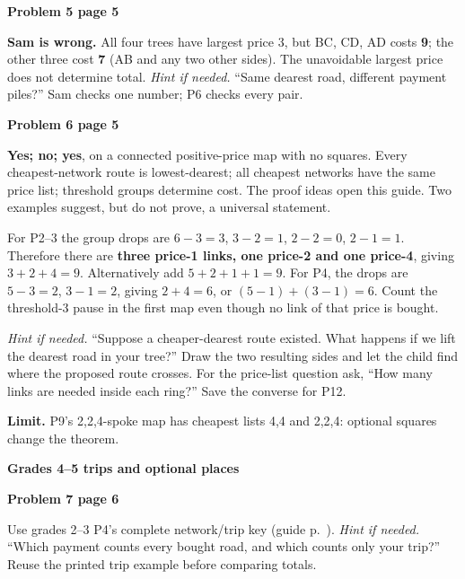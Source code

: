 \documentclass[11pt]{article}
\newcommand{\head}[1]{\par{\large\bfseries #1}\par\nobreak}
\newcommand{\sub}[1]{\par\textbf{#1}\par\nobreak}
\newcommand{\hint}[1]{\textit{Hint if needed.} #1}
\begin{document}
\sub{Problem 5 page 5}
\textbf{Sam is wrong.} All four trees have largest price 3, but BC, CD, AD costs \textbf{9}; the other three cost \textbf{7} (AB and any two other sides). The unavoidable largest price does not determine total. \hint{``Same dearest road, different payment piles?''} Sam checks one number; P6 checks every pair.

\sub{Problem 6 page 5}
\textbf{Yes; no; yes}, on a connected positive-price map with no squares. Every cheapest-network route is lowest-dearest; all cheapest networks have the same price list; threshold groups determine cost. The proof ideas open this guide. Two examples suggest, but do not prove, a universal statement.

For P2--3 the group drops are $6-3=3$, $3-2=1$, $2-2=0$, $2-1=1$. Therefore there are \textbf{three price-1 links, one price-2 and one price-4}, giving $3+2+4=9$. Alternatively add $5+2+1+1=9$. For P4, the drops are $5-3=2$, $3-1=2$, giving $2+4=6$, or $(5-1)+(3-1)=6$. Count the threshold-3 pause in the first map even though no link of that price is bought.

\hint{``Suppose a cheaper-dearest route existed. What happens if we lift the dearest road in your tree?''} Draw the two resulting sides and let the child find where the proposed route crosses. For the price-list question ask, ``How many links are needed inside each ring?'' Save the converse for P12.

\textbf{Limit.} P9's 2,2,4-spoke map has cheapest lists 4,4 and 2,2,4: optional squares change the theorem.
\bigskip
\head{Grades 4--5 trips and optional places}
\sub{Problem 7 page 6}
Use grades 2--3 P4's complete network/trip key (guide p.~\pageref{trip-key}). \hint{``Which payment counts every bought road, and which counts only your trip?''} Reuse the printed trip example before comparing totals.
\end{document}
